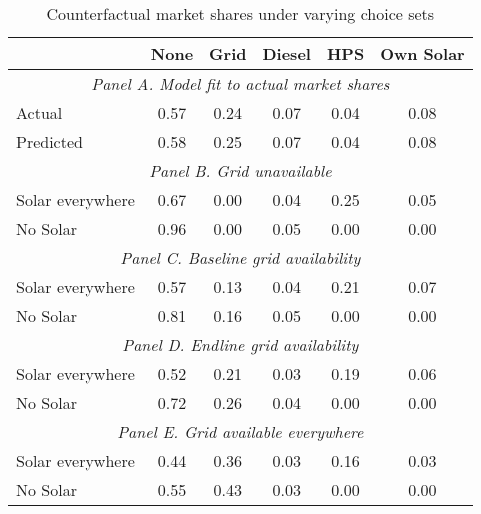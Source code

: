 \begin{table}[htbp]\centering
\caption{Counterfactual market shares under varying choice sets}
\begin{tabular}{l*{5}{c}}
\toprule
            &        None&        Grid&      Diesel&         HPS&   Own Solar\\
\midrule
\multicolumn{6}{c}{\emph{Panel A. Model fit to actual market shares}} \\
Actual      &        0.57&        0.24&        0.07&        0.04&        0.08\\
Predicted   &        0.58&        0.25&        0.07&        0.04&        0.08\\
\multicolumn{6}{c}{\emph{Panel B. Grid unavailable}}\\
Solar everywhere &        0.67&        0.00&        0.04&        0.25&        0.05\\
No Solar    &        0.96&        0.00&        0.05&        0.00&        0.00\\
\multicolumn{6}{c}{\emph{Panel C. Baseline grid availability}}\\
Solar everywhere &        0.57&        0.13&        0.04&        0.21&        0.07\\
No Solar    &        0.81&        0.16&        0.05&        0.00&        0.00\\
\multicolumn{6}{c}{\emph{Panel D. Endline grid availability}}\\
Solar everywhere &        0.52&        0.21&        0.03&        0.19&        0.06\\
No Solar    &        0.72&        0.26&        0.04&        0.00&        0.00\\
\multicolumn{6}{c}{\emph{Panel E. Grid available everywhere}}\\
Solar everywhere &        0.44&        0.36&        0.03&        0.16&        0.03\\
No Solar    &        0.55&        0.43&        0.03&        0.00&        0.00\\
\bottomrule
\end{tabular}
\end{table}
